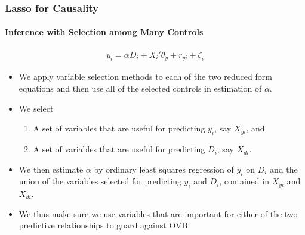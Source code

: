 \documentclass[
  shownotes,
  xcolor={svgnames},
  hyperref={colorlinks,citecolor=DarkBlue,linkcolor=DarkRed,urlcolor=DarkBlue}
  , aspectratio=169]{beamer}
\begin{document}
\begin{frame}[fragile]
\frametitle{Lasso for Causality}
\framesubtitle{Inference with Selection among Many Controls}

\begin{align}
    y_i = \alpha D_i + X_i'\theta_y +r_{yi} + \zeta_i
  \end{align}

\begin{itemize}
\item We apply variable selection methods to each of the two reduced form equations and then use all of the selected controls in estimation of $\alpha$. 
\medskip
\item We select
\begin{enumerate}
\item A set of variables that are useful for predicting $y_i$, say $X_{yi}$, and 
\item A set of variables that are useful for predicting $D_i$, say $X_{di}$.

\end{enumerate}
\item We then estimate $\alpha$ by ordinary least squares regression of $y_i$ on $D_i$ and the union of the variables selected for predicting $y_i$ and $D_i$, contained in $X_{yi}$ and $X_{di}$. 

\item We thus make sure we use variables that are important for either of the two predictive relationships to guard against OVB

\end{itemize}
\end{frame}
\end{document}
